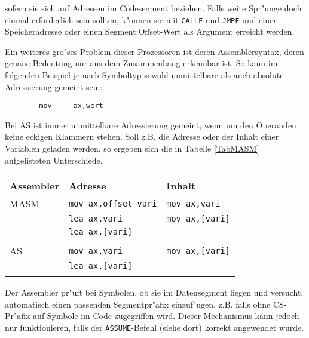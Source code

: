 \documentclass[12pt,a4paper,twoside]{report}
\newcommand{\tty}[1]{{\tt #1}}
\begin{document}
sofern sie sich auf Adressen im Codesegment beziehen.  Falls weite Spr"unge
doch einmal erforderlich sein sollten, k"onnen sie mit \tty{CALLF} und
\tty{JMPF} und einer Speicheradresse oder einen Segment:Offset-Wert als
Argument erreicht werden.
\par
Ein weiteres gro"ses Problem dieser Prozessoren ist deren Assemblersyntax,
deren genaue Bedeutung nur aus dem Zusammenhang erkennbar ist.  So kann im
folgenden Beispiel je nach Symboltyp sowohl unmittelbare als auch absolute
Adressierung gemeint sein:
\begin{verbatim}
        mov     ax,wert
\end{verbatim}
Bei AS ist immer unmittelbare Adressierung gemeint, wenn um den Operanden
keine eckigen Klammern stehen.  Soll z.B. die Adresse oder der Inhalt einer
Variablen geladen werden, so ergeben sich die in Tabelle \ref{TabMASM}
aufgelisteten Unterschiede.
\begin{table*}
\begin{center}\begin{tabular}{|l|l|l|}
\hline
Assembler  & Adresse                  & Inhalt                 \\
\hline
\hline
MASM       & \tty{mov ax,offset vari} & \tty{mov ax,vari}      \\
           & \tty{lea ax,vari}        & \tty{mov ax,[vari]}    \\
           & \tty{lea ax,[vari]}      &                        \\
           &                          &                        \\
AS         & \tty{mov ax,vari}        & \tty{mov ax,[vari]}    \\
           & \tty{lea ax,[vari]}      &                        \\
           &                          &                        \\
\hline
\end{tabular}\end{center}
\caption{Unterschiede in der Adressierungssyntax AS$\leftrightarrow$MASM\label{TabMASM}}
\normalsize
\end{table*}
\par
Der Assembler pr"uft bei Symbolen, ob sie im Datensegment liegen und
versucht, automatisch einen passenden Segmentpr"afix einzuf"ugen, z.B.
falls ohne CS-Pr"afix auf Symbole im Code zugegriffen wird.  Dieser
Mechanismus kann jedoch nur funktionieren, falls der \tty{ASSUME}-Befehl
(siehe dort) korrekt angewendet wurde.
\end{document}
